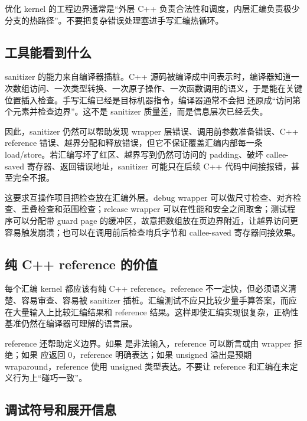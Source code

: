 \begin{keyidea}
优化 kernel 的工程边界通常是“外层 C++ 负责合法性和调度，内层汇编负责极少分支的热路径”。不要把复杂错误处理塞进手写汇编热循环。
\end{keyidea}

\subsection{工具能看到什么}

sanitizer 的能力来自编译器插桩。C++ 源码被编译成中间表示时，编译器知道一次数组访问、一次类型转换、一次原子操作、一次函数调用的语义，于是能在关键位置插入检查。手写汇编已经是目标机器指令，编译器通常不会把  还原成“访问第  个元素并检查边界”。这不是 sanitizer 质量差，而是信息层次已经丢失。

因此，sanitizer 仍然可以帮助发现 wrapper 层错误、调用前参数准备错误、C++ reference 错误、越界分配和释放错误，但它不保证覆盖汇编内部每一条 load/store。若汇编写坏了红区、越界写到仍然可访问的 padding、破坏 callee-saved 寄存器、返回错误地址，sanitizer 可能只在后续 C++ 代码中间接报错，甚至完全不报。

这要求互操作项目把检查放在汇编外层。debug wrapper 可以做尺寸检查、对齐检查、重叠检查和范围检查；release wrapper 可以在性能和安全之间取舍；测试程序可以分配带 guard page 的缓冲区，故意把数组放在页边界附近，让越界访问更容易触发崩溃；也可以在调用前后检查哨兵字节和 callee-saved 寄存器间接效果。

\subsection{纯 C++ reference 的价值}

每个汇编 kernel 都应该有纯 C++ reference。reference 不一定快，但必须语义清楚、容易审查、容易被 sanitizer 插桩。汇编测试不应只比较少量手算答案，而应在大量输入上比较汇编结果和 reference 结果。这样即使汇编实现很复杂，正确性基准仍然在编译器可理解的语言层。

reference 还帮助定义边界。如果  是非法输入，reference 可以断言或由 wrapper 拒绝；如果  应返回 0，reference 明确表达；如果 unsigned 溢出是预期 wraparound，reference 使用 unsigned 类型表达。不要让 reference 和汇编在未定义行为上“碰巧一致”。

\subsection{调试符号和展开信息}

